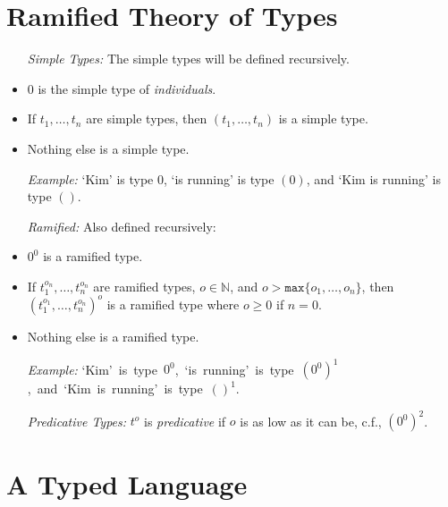 \documentclass[a4paper, 11pt]{article} %
\newcommand{\set}[1]{\lbrace#1\rbrace} %
\newcommand{\N}{\mathbb{N}}
\renewcommand{\max}[1]{\texttt{max}\set{#1}}
\begin{document}
\section*{Ramified Theory of Types}

  \begin{itemize}
    \item[\it Simple Types:] The simple types will be defined recursively.
      \item $0$ is the simple type of \textit{individuals}.
      \item If $t_1,\ldots,t_n$ are simple types, then $(t_1,\ldots,t_n)$ is a simple type. 
      \item Nothing else is a simple type.
    \item[\it Example:] `Kim' is type $0$, `is running' is type $(0)$, and `Kim is running' is type $()$.
    \item[\it Ramified:] Also defined recursively:
      \item $0^0$ is a ramified type. 
      \item If $t_1^{o_n},\ldots,t_n^{o_n}$ are ramified types, $o\in\N$, and $o>\max{o_1,\ldots,o_n}$, then $(t_1^{o_1},\ldots,t_n^{o_n})^o$ is a ramified type where $o\geq 0$ if $n=0$. 
      \item Nothing else is a ramified type.
    \item[\it Example:] \mbox{`Kim' is type $0^0$, `is running' is type $(0^0)^1$, and `Kim is running' is type $()^1$.}
    \item[\it Predicative Types:] $t^o$ is \textit{predicative} if $o$ is as low as it can be, c.f., $(0^0)^2$.  
  \end{itemize}





\section*{A Typed Language}
\end{document}
